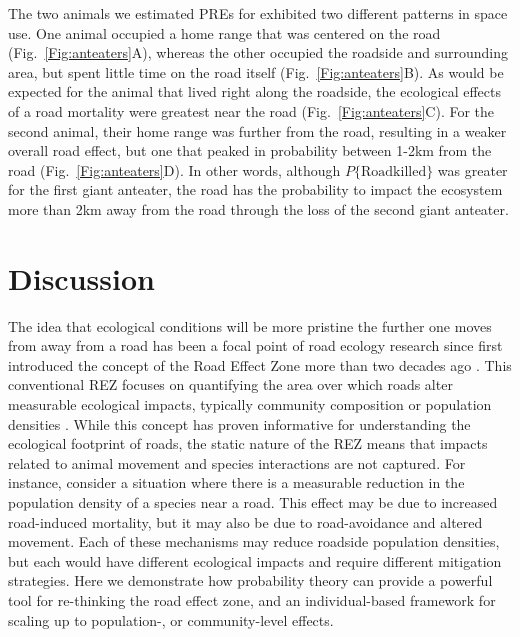 \documentclass[11pt]{article}
\begin{document}
The two animals we estimated PREs for exhibited two different patterns in space use. One animal occupied a home range that was centered on the road (Fig.~\ref{Fig:anteaters}A), whereas the other occupied the roadside and surrounding area, but spent little time on the road itself (Fig.~\ref{Fig:anteaters}B). As would be expected for the animal that lived right along the roadside, the ecological effects of a road mortality were greatest near the road (Fig.~\ref{Fig:anteaters}C). For the second animal, their home range was further from the road, resulting in a weaker overall road effect, but one that peaked in probability between 1-2km from the road (Fig.~\ref{Fig:anteaters}D). In other words, although $P\{\mathrm{Roadkilled}\}$ was greater for the first giant anteater, the road has the probability to impact the ecosystem more than 2km away from the road through the loss of the second giant anteater.




\section*{Discussion}

The idea that ecological conditions will be more pristine the further one moves from away from a road has been a focal point of road ecology research since \cite{Forman:1998} first introduced the concept of the Road Effect Zone more than two decades ago \citep{Reijnen:1996, Forman:1998, Forman:2000b, Semlitsch:2007, Eigenbrod:2009, Peaden:2015, Brady:2017, Andrasi:2021}. This conventional REZ focuses on quantifying the area over which roads alter measurable ecological impacts, typically community composition or population densities \citep{Reijnen:1996, Truscott:2005, Fahrig:2009, Andrasi:2021}. While this concept has proven informative for understanding the ecological footprint of roads, the static nature of the REZ means that impacts related to animal movement and species interactions are not captured. For instance, consider a situation where there is a measurable reduction in the population density of a species near a road. This effect may be due to increased road-induced mortality, but it may also be due to road-avoidance and altered movement. Each of these mechanisms may reduce roadside population densities, but each would have different ecological impacts and require different mitigation strategies. Here we demonstrate how probability theory can provide a powerful tool for re-thinking the road effect zone, and an individual-based framework for scaling up to population-, or community-level effects.
\end{document}
